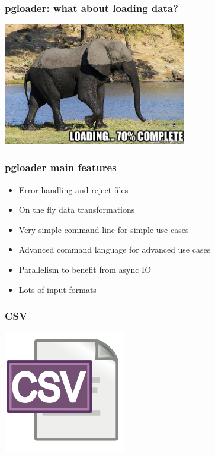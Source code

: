 \documentclass{beamer}
\begin{document}
\begin{frame}
  \frametitle{pgloader: what about loading data?}


  \begin{center}
    \includegraphics[height=2.1in]{elephant-loading.jpg}
  \end{center}
\end{frame}

\begin{frame}[fragile]
  \frametitle{pgloader main features}

  \vfill
  
  \begin{itemize}
  \item Error handling and reject files
  \item On the fly data transformations
  \item Very simple command line for simple use cases
  \item Advanced command language for advanced use cases
  \item Parallelism to benefit from async IO
  \item Lots of input formats
  \end{itemize}  
\end{frame}

\begin{frame}
  \frametitle{CSV}


  \begin{center}
    \includegraphics[height=2.1in]{csv_text.png}
  \end{center}
\end{frame}
\end{document}
